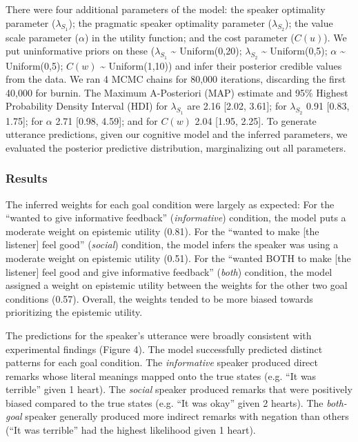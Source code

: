 \documentclass[10pt, letterpaper]{article}
\begin{document}
There were four additional parameters of the model: the speaker
optimality parameter (\(\lambda_{S_1}\)); the pragmatic speaker
optimality parameter (\(\lambda_{S_2}\)); the value scale parameter
(\(\alpha\)) in the utility function; and the cost parameter (\(C(u)\)).
We put uninformative priors on these (\(\lambda_{S_1}\)
\textasciitilde{} Uniform(0,20); \(\lambda_{S_2}\) \textasciitilde{}
Uniform(0,5); \(\alpha\) \textasciitilde{} Uniform(0,5); \(C(w)\)
\textasciitilde{} Uniform(1,10)) and infer their posterior credible
values from the data. We ran 4 MCMC chains for 80,000 iterations,
discarding the first 40,000 for burnin. The Maximum A-Posteriori (MAP)
estimate and 95\% Highest Probability Density Interval (HDI) for
\(\lambda_{S_1}\) are 2.16 {[}2.02, 3.61{]}; for \(\lambda_{S_2}\) 0.91
{[}0.83, 1.75{]}; for \(\alpha\) 2.71 {[}0.98, 4.59{]}; and for \(C(w)\)
2.04 {[}1.95, 2.25{]}. To generate utterance predictions, given our
cognitive model and the inferred parameters, we evaluated the posterior
predictive distribution, marginalizing out all parameters.

\subsubsection{Results}\label{results-1}

The inferred weights for each goal condition were largely as expected:
For the ``wanted to give informative feedback'' (\emph{informative})
condition, the model puts a moderate weight on epistemic utility (0.81).
For the ``wanted to make {[}the listener{]} feel good'' (\emph{social})
condition, the model infers the speaker was using a moderate weight on
epistemic utility (0.51). For the ``wanted BOTH to make {[}the
listener{]} feel good and give informative feedback'' (\emph{both})
condition, the model assigned a weight on epistemic utility between the
weights for the other two goal conditions (0.57). Overall, the weights
tended to be more biased towards prioritizing the epistemic utility.

The predictions for the speaker's utterance were broadly consistent with
experimental findings (Figure 4). The model successfully predicted
distinct patterns for each goal condition. The \emph{informative}
speaker produced direct remarks whose literal meanings mapped onto the
true states (e.g. ``It was terrible'' given 1 heart). The \emph{social}
speaker produced remarks that were positively biased compared to the
true states (e.g. ``It was okay'' given 2 hearts). The \emph{both-goal}
speaker generally produced more indirect remarks with negation than
others (``It was terrible'' had the highest likelihood given 1 heart).
\end{document}
